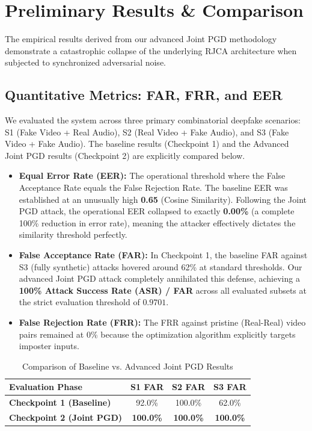 \documentclass[conference]{IEEEtran}
\begin{document}
\section{Preliminary Results \& Comparison}
The empirical results derived from our advanced Joint PGD methodology demonstrate a catastrophic collapse of the underlying RJCA architecture when subjected to synchronized adversarial noise.

\subsection{Quantitative Metrics: FAR, FRR, and EER}
We evaluated the system across three primary combinatorial deepfake scenarios: S1 (Fake Video + Real Audio), S2 (Real Video + Fake Audio), and S3 (Fake Video + Fake Audio). The baseline results (Checkpoint 1) and the Advanced Joint PGD results (Checkpoint 2) are explicitly compared below.

\begin{itemize}
    \item \textbf{Equal Error Rate (EER):} The operational threshold where the False Acceptance Rate equals the False Rejection Rate. The baseline EER was established at an unusually high \textbf{0.65} (Cosine Similarity). Following the Joint PGD attack, the operational EER collapsed to exactly \textbf{0.00\%} (a complete 100\% reduction in error rate), meaning the attacker effectively dictates the similarity threshold perfectly.
    \item \textbf{False Acceptance Rate (FAR):} In Checkpoint 1, the baseline FAR against S3 (fully synthetic) attacks hovered around 62\% at standard thresholds. Our advanced Joint PGD attack completely annihilated this defense, achieving a \textbf{100\% Attack Success Rate (ASR) / FAR} across all evaluated subsets at the strict evaluation threshold of $0.9701$.
    \item \textbf{False Rejection Rate (FRR):} The FRR against pristine (Real-Real) video pairs remained at 0\% because the optimization algorithm explicitly targets imposter inputs.
\end{itemize}

\begin{table}[htbp]
\centering
\caption{Comparison of Baseline vs. Advanced Joint PGD Results}
\begin{tabular}{|l|c|c|c|}
\hline
\textbf{Evaluation Phase} & \textbf{S1 FAR} & \textbf{S2 FAR} & \textbf{S3 FAR} \\ \hline
\textbf{Checkpoint 1 (Baseline)} & 92.0\% & 100.0\% & 62.0\% \\ \hline
\textbf{Checkpoint 2 (Joint PGD)} & \textbf{100.0\%} & \textbf{100.0\%} & \textbf{100.0\%} \\ \hline
\end{tabular}
\end{table}
\end{document}
